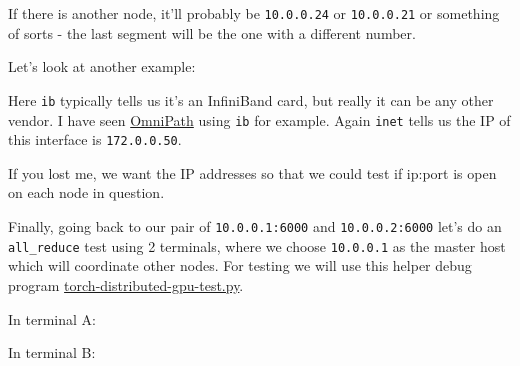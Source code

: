 \documentclass[
]{report}
\newenvironment{Shaded}{\begin{snugshade}}{\end{snugshade}}
\newcommand{\AttributeTok}[1]{\textcolor[rgb]{0.40,0.45,0.13}{#1}}
\newcommand{\DataTypeTok}[1]{\textcolor[rgb]{0.68,0.00,0.00}{#1}}
\newcommand{\ExtensionTok}[1]{\textcolor[rgb]{0.00,0.23,0.31}{#1}}
\newcommand{\FunctionTok}[1]{\textcolor[rgb]{0.28,0.35,0.67}{#1}}
\newcommand{\NormalTok}[1]{\textcolor[rgb]{0.00,0.23,0.31}{#1}}
\newcommand{\VariableTok}[1]{\textcolor[rgb]{0.07,0.07,0.07}{#1}}
\begin{document}
If there is another node, it'll probably be \texttt{10.0.0.24} or
\texttt{10.0.0.21} or something of sorts - the last segment will be the
one with a different number.

Let's look at another example:

\begin{Shaded}
\end{Shaded}

Here \texttt{ib} typically tells us it's an InfiniBand card, but really
it can be any other vendor. I have seen
\href{../network\#omnipath}{OmniPath} using \texttt{ib} for example.
Again \texttt{inet} tells us the IP of this interface is
\texttt{172.0.0.50}.

If you lost me, we want the IP addresses so that we could test if
ip:port is open on each node in question.

Finally, going back to our pair of \texttt{10.0.0.1:6000} and
\texttt{10.0.0.2:6000} let's do an \texttt{all\_reduce} test using 2
terminals, where we choose \texttt{10.0.0.1} as the master host which
will coordinate other nodes. For testing we will use this helper debug
program
\href{./torch-distributed-gpu-test.py}{torch-distributed-gpu-test.py}.

In terminal A:

\begin{Shaded}
\end{Shaded}

In terminal B:
\end{document}
